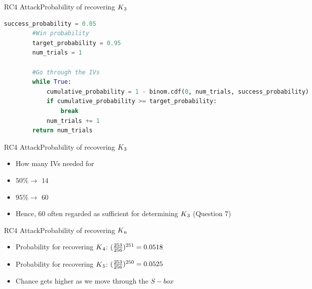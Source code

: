 \documentclass[
	aspectratio=169,	%
	onlytextwidth,		%
	t					%
	]{beamer}
\begin{document}
\begin{frame}[fragile]{RC4 Attack}{Probability of recovering $K\textsubscript{3}$}
	\begin{lstlisting}[language=Python]
		success_probability = 0.05
		#Win probability
		target_probability = 0.95
		num_trials = 1

		#Go through the IVs
		while True:
			cumulative_probability = 1 - binom.cdf(0, num_trials, success_probability)
			if cumulative_probability >= target_probability:
				break
			num_trials += 1
		return num_trials
	\end{lstlisting}
\end{frame}

\begin{frame}[fragile]{RC4 Attack}{Probability of recovering $K\textsubscript{3}$}
	\begin{itemize}
		\item How many IVs needed for 
		\item $50\% \rightarrow$ $14$
		\item $95\% \rightarrow$ $60$
		\item Hence, $60$ often regarded as sufficient for determining $K\textsubscript{3}$ (Question 7)
	\end{itemize}
\end{frame}

\begin{frame}[fragile]{RC4 Attack}{Probability of recovering $K\textsubscript{n}$}
	\begin{itemize}
		\item Probability for recovering $K\textsubscript{4}$: $(\frac{253}{256})\textsuperscript{251} = 0.0518$
		\item Probability for recovering $K\textsubscript{5}$: $(\frac{253}{256})\textsuperscript{250} = 0.0525$
		\item Chance gets higher as we move through the $S-box$
	\end{itemize}
\end{frame}
\end{document}
